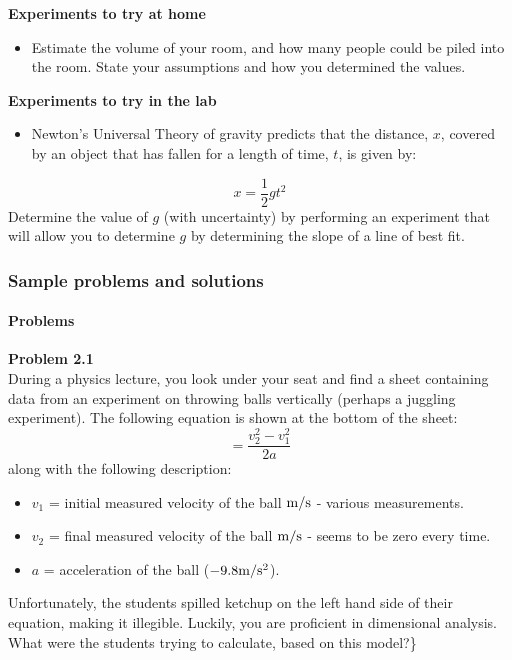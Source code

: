 \begin{framed}
\textbf{Experiments to try at home}\\
\begin{itemize}
\item Estimate the volume of your room, and how many people could be piled into the room. State your assumptions and how you determined the values.
\end{itemize}
\end{framed}

\begin{framed}
\textbf{Experiments to try in the lab}\\
\begin{itemize}
\item Newton's Universal Theory of gravity predicts that the distance, $x$, covered by an object that has fallen for a length of time, $t$, is given by:
\end{itemize}
\begin{equation}
x = \frac{1}{2}gt^2
\end{equation}
Determine the value of $g$ (with uncertainty) by performing an experiment that will allow you to determine $g$ by determining the slope of a line of best fit.
\end{framed}

\subsubsection{Sample problems and solutions}

\paragraph{Problems}

\begin{framed}
\textbf{Problem 2.1}\\
During a physics lecture, you look under your seat and find a sheet containing data from an experiment on throwing balls vertically (perhaps a juggling experiment). The following equation is shown at the bottom of the sheet:
\begin{equation}
=\frac{v_2^{2}-v_1^{2}}{2a}
\end{equation}
along with the following description:

\begin{itemize}
\item $v_1$ = initial measured velocity of the ball ${\rm m/s}$ - various measurements.
\item $v_2$ = final measured velocity of the ball ${\rm m/s}$ - seems to be zero every time.
\item $a$ = acceleration of the ball ($-9.8 {\rm m/s^2}$).
\end{itemize}

Unfortunately, the students spilled ketchup on the left hand side of their equation, making it illegible. Luckily, you are proficient in dimensional analysis. What were the students trying to calculate, based on this model?\}
\end{framed}


